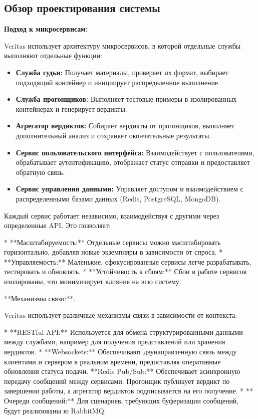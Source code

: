 \subsection{Обзор проектирования системы}

\textbf{Подход к микросервисам:}
\noindent

Veritas использует архитектуру микросервисов, в которой отдельные службы выполняют отдельные функции:
\noindent
\begin{itemize}
\item \textbf{Служба судьи:} Получает материалы, проверяет их формат, выбирает подходящий контейнер и инициирует распределенное выполнение.
\item \textbf{Служба прогонщиков:} Выполняет тестовые примеры в изолированных контейнерах и генерирует вердикты.
\item \textbf{Агрегатор вердиктов:} Собирает вердикты от прогонщиков, выполняет дополнительный анализ и сохраняет окончательные результаты.
\item \textbf{Сервис пользовательского интерфейса:} Взаимодействует с пользователями, обрабатывает аутентификацию, отображает статус отправки и предоставляет обратную связь.
\item \textbf{Сервис управления данными:} Управляет доступом и взаимодействием с распределенными базами данных (Redis, PostgreSQL, MongoDB).
\end{itemize}

Каждый сервис работает независимо, взаимодействуя с другими через определенные API. Это позволяет:

* **Масштабируемость:** Отдельные сервисы можно масштабировать горизонтально, добавляя новые экземпляры в зависимости от спроса.
* **Управляемость:** Маленькие, сфокусированные сервисы легче разрабатывать, тестировать и обновлять.
* **Устойчивость к сбоям:** Сбои в работе сервисов изолированы, что минимизирует влияние на всю систему.

**Механизмы связи:**.

Veritas использует различные механизмы связи в зависимости от контекста:

* **RESTful API:** Используется для обмена структурированными данными между службами, например для получения представлений или хранения вердиктов.
* **Websockets:** Обеспечивают двунаправленную связь между клиентами и сервером в реальном времени, предоставляя оперативные обновления статуса подачи.
**Redis Pub/Sub:** Обеспечивает асинхронную передачу сообщений между сервисами. Прогонщик публикует вердикт по завершении работы, а агрегатор вердиктов подписывается на его получение.
* ** Очереди сообщений:** Для сценариев, требующих буферизации сообщений, будут реализованы ю RabbitMQ.

